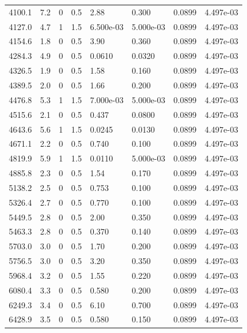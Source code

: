 \documentclass[preview]{standalone}
\begin{document}
{{{\begin{tabular}{L{1.2cm}C{1.2cm} C{0.3cm}C{0.5cm} C{1.4cm}C{1.4cm} C{1.4cm}C{1.4cm}}
  4100.1  &   7.2  & 0     & 0.5 &  2.88  & 0.300  & 0.0899 &  4.497e-03   \\ 
  4127.0  &   4.7  & 1     & 1.5 &  6.500e-03  & 5.000e-03  & 0.0899 &  4.497e-03   \\ 
  4154.6  &   1.8  & 0     & 0.5 &  3.90  & 0.360  & 0.0899 &  4.497e-03   \\ 
  4284.3  &   4.9  & 0     & 0.5 &  0.0610  & 0.0320  & 0.0899 &  4.497e-03   \\ 
  4326.5  &   1.9  & 0     & 0.5 &  1.58  & 0.160  & 0.0899 &  4.497e-03   \\ 
  4389.5  &   2.0  & 0     & 0.5 &  1.66  & 0.200  & 0.0899 &  4.497e-03   \\ 
  4476.8  &   5.3  & 1     & 1.5 &  7.000e-03  & 5.000e-03  & 0.0899 &  4.497e-03   \\ 
  4515.6  &   2.1  & 0     & 0.5 &  0.437  & 0.0800  & 0.0899 &  4.497e-03   \\ 
  4643.6  &   5.6  & 1     & 1.5 &  0.0245  & 0.0130  & 0.0899 &  4.497e-03   \\ 
  4671.1  &   2.2  & 0     & 0.5 &  0.740  & 0.100  & 0.0899 &  4.497e-03   \\ 
  4819.9  &   5.9  & 1     & 1.5 &  0.0110  & 5.000e-03  & 0.0899 &  4.497e-03   \\ 
  4885.8  &   2.3  & 0     & 0.5 &  1.54  & 0.170  & 0.0899 &  4.497e-03   \\ 
  5138.2  &   2.5  & 0     & 0.5 &  0.753  & 0.100  & 0.0899 &  4.497e-03   \\ 
  5326.4  &   2.7  & 0     & 0.5 &  0.770  & 0.100  & 0.0899 &  4.497e-03   \\ 
  5449.5  &   2.8  & 0     & 0.5 &  2.00  & 0.350  & 0.0899 &  4.497e-03   \\ 
  5463.3  &   2.8  & 0     & 0.5 &  0.370  & 0.140  & 0.0899 &  4.497e-03   \\ 
  5703.0  &   3.0  & 0     & 0.5 &  1.70  & 0.200  & 0.0899 &  4.497e-03   \\ 
  5756.5  &   3.0  & 0     & 0.5 &  3.20  & 0.350  & 0.0899 &  4.497e-03   \\ 
  5968.4  &   3.2  & 0     & 0.5 &  1.55  & 0.220  & 0.0899 &  4.497e-03   \\ 
  6080.4  &   3.3  & 0     & 0.5 &  0.580  & 0.200  & 0.0899 &  4.497e-03   \\ 
  6249.3  &   3.4  & 0     & 0.5 &  6.10  & 0.700  & 0.0899 &  4.497e-03   \\ 
  6428.9  &   3.5  & 0     & 0.5 &  0.580  & 0.150  & 0.0899 &  4.497e-03   \\ 

\end{tabular}}}}
\end{document}
